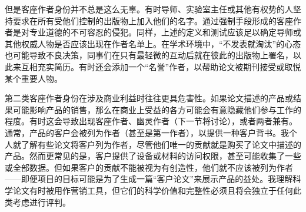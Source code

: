 但是客座作者身份并不总是这么无辜。有时导师、实验室主任或其他有权势的人坚持要求在所有受他们控制的出版物上加入他们的名字。通过强制手段形成的客座作者是对专业道德的不可容忍的侵犯。同样，上述的定义和测试应该足以确定导师或其他权威人物是否应该出现在作者名单上。在学术环境中，“不发表就淘汰”的心态也可能导致不良决策，同事们在只有最轻微的互动后就在彼此的出版物上署名，以此来互相充实简历。有时还会添加一个“名誉”作者，以帮助论文被期刊接受或取悦某个重要人物。

第二类客座作者身份在涉及商业利益时往往更具危害性。如果论文描述的产品或结果可能影响产品的销售，那么在商业上受益的各方可能会有意隐藏他们参与工作的程度。有时这会导致出现客座作者、幽灵作者（下一节将讨论），或者两者兼有。通常，产品的客户会被列为作者（甚至是第一作者），以提供一种客户背书。我个人就了解有些论文将客户列为作者，尽管他们唯一的贡献就是购买了论文中描述的产品。然而更常见的是，客户提供了设备或材料的访问权限，甚至可能收集了一些或全部数据。但如果客户的贡献不能被视为有创造性，他们就不应该被列为作者——即便项目的目标可能是为了生成一篇“客户论文”来展示产品的益处。我理解科学论文有时被用作营销工具，但它们的科学价值和完整性必须且将会独立于任何此类考虑进行评判。

